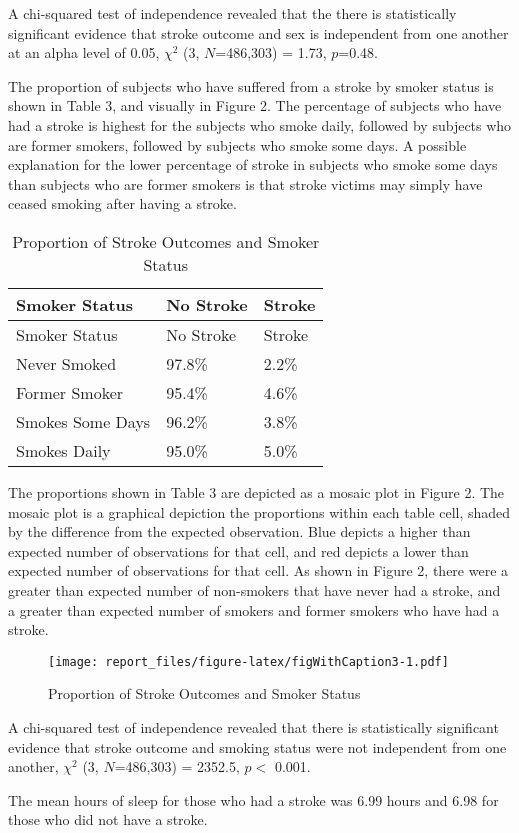 \documentclass[11pt,]{article}
\begin{document}
A chi-squared test of independence revealed that the there is
statistically significant evidence that stroke outcome and sex is
independent from one another at an alpha level of 0.05, \(\chi^2\) (3,
\(N\)=486,303) = 1.73, \(p\)=0.48.

The proportion of subjects who have suffered from a stroke by smoker
status is shown in Table 3, and visually in Figure 2. The percentage of
subjects who have had a stroke is highest for the subjects who smoke
daily, followed by subjects who are former smokers, followed by subjects
who smoke some days. A possible explanation for the lower percentage of
stroke in subjects who smoke some days than subjects who are former
smokers is that stroke victims may simply have ceased smoking after
having a stroke.

\begin{longtable}[]{@{}lll@{}}
\caption{Proportion of Stroke Outcomes and Smoker Status}\tabularnewline
\toprule
Smoker Status & No Stroke & Stroke\tabularnewline
\midrule
\endfirsthead
\toprule
Smoker Status & No Stroke & Stroke\tabularnewline
\midrule
\endhead
Never Smoked & 97.8\% & 2.2\%\tabularnewline
Former Smoker & 95.4\% & 4.6\%\tabularnewline
Smokes Some Days & 96.2\% & 3.8\%\tabularnewline
Smokes Daily & 95.0\% & 5.0\%\tabularnewline
\bottomrule
\end{longtable}

The proportions shown in Table 3 are depicted as a mosaic plot in Figure
2. The mosaic plot is a graphical depiction the proportions within each
table cell, shaded by the difference from the expected observation. Blue
depicts a higher than expected number of observations for that cell, and
red depicts a lower than expected number of observations for that cell.
As shown in Figure 2, there were a greater than expected number of
non-smokers that have never had a stroke, and a greater than expected
number of smokers and former smokers who have had a stroke.

\begin{figure}
\centering
\texttt{[image: report\_files/figure-latex/figWithCaption3-1.pdf]}
\caption{Proportion of Stroke Outcomes and Smoker Status}
\end{figure}

A chi-squared test of independence revealed that there is statistically
significant evidence that stroke outcome and smoking status were not
independent from one another, \(\chi^2\) (3, \(N\)=486,303) = 2352.5,
\(p <\) 0.001.

The mean hours of sleep for those who had a stroke was 6.99 hours and
6.98 for those who did not have a stroke.
\end{document}
